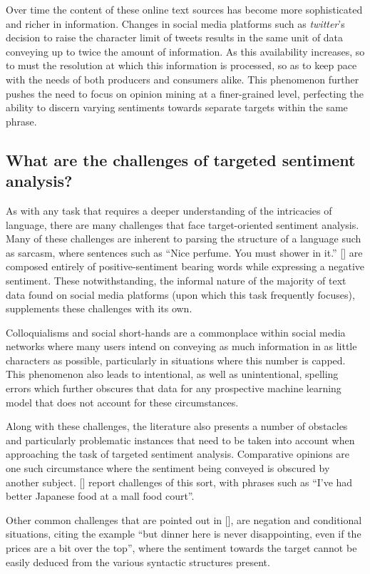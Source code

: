 \documentclass[12pt, a4paper]{report}
\theoremstyle{definition}
\theoremstyle{definition}%
\theoremstyle{definition}%
\theoremstyle{definition}%
\theoremstyle{definition}%
\theoremstyle{definition}%
\renewcommand{\cite}[1]{[\citealp{#1}]}
\begin{document}
Over time the content of these online text sources has become more sophisticated and richer in information. Changes in social media platforms such as \textit{twitter}'s decision to raise the character limit of tweets results in the same unit of data conveying up to twice the amount of information. As this availability increases, so to must the resolution at which this information is processed, so as to keep pace with the needs of both producers and consumers alike. This phenomenon further pushes the need to focus on opinion mining at a finer-grained level, perfecting the ability to discern varying sentiments towards separate targets within the same phrase. 

\subsection{What are the challenges of targeted sentiment analysis?}
As with any task that requires a deeper understanding of the intricacies of language, there are many challenges that face target-oriented sentiment analysis. Many of these challenges are inherent to parsing the structure of a language such as sarcasm, where sentences such as \enquote{Nice perfume. You must shower in it.} \cite{kharde2016} are composed entirely of positive-sentiment bearing words while expressing a negative sentiment. These notwithstanding, the informal nature of the majority of text data found on social media platforms (upon which this task frequently focuses), supplements these challenges with its own. 

Colloquialisms and social short-hands are a commonplace within social media networks where many users intend on conveying as much information in as little characters as possible, particularly in situations where this number is capped. This phenomenon also leads to intentional, as well as unintentional, spelling errors which further obscures that data for any prospective machine learning model that does not account for these circumstances. 

Along with these challenges, the literature also presents a number of obstacles and particularly problematic instances that need to be taken into account when approaching the task of targeted sentiment analysis. Comparative opinions are one such circumstance where the sentiment being conveyed is obscured by another subject. \cite{tang2016} report challenges of this sort, with phrases such as \enquote{I've had better Japanese food at a mall food court}.  

Other common challenges that are pointed out in \cite{tang2016}, are negation and conditional situations, citing the example \enquote{but dinner here is never disappointing, even if the prices are a bit over the top}, where the sentiment towards the target cannot be easily deduced from the various syntactic structures present.
\end{document}
